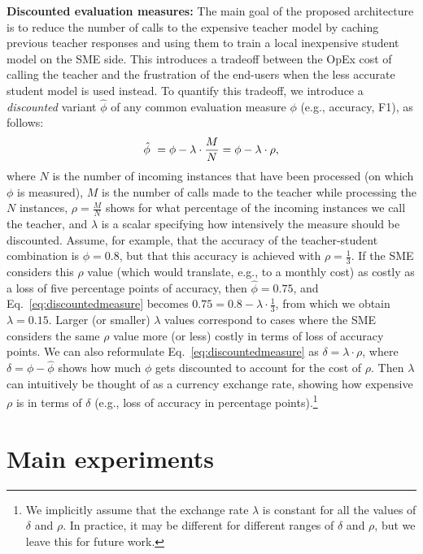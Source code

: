 \documentclass[11pt]{article}
\begin{document}
\vspace{1mm}\noindent\textbf{Discounted evaluation measures:}
The main goal of the proposed architecture is to reduce the number of calls to the expensive teacher model by caching previous teacher responses and using them to train a local inexpensive student model on the SME side. This introduces a tradeoff between the OpEx cost of calling the teacher and the frustration of the end-users when the less accurate student model is used instead. To quantify this tradeoff, we introduce a \emph{discounted} variant $\hat{\phi}$ of any common evaluation measure $\phi$ (e.g., accuracy, F1), as follows:
\begin{equation}
\label{eq:discountedmeasure}   
\hat{\phi}\ = \phi - \lambda \cdot \frac{M}{N} = 
\phi - \lambda \cdot \rho,
\vspace{-2mm}
\end{equation}
where $N$ is the number of incoming instances that have been processed (on which $\phi$ is measured), $M$ is the number of calls made to the teacher while processing the $N$ instances, $\rho = \frac{M}{N}$ shows for what percentage of the incoming instances we call the teacher, and $\lambda$ is a scalar specifying how intensively the measure should be discounted. Assume, for example, that the accuracy of the teacher-student combination is $\phi = 0.8$, but that this accuracy is achieved with $\rho=\frac{1}{3}$. If the SME considers this $\rho$ value (which would translate, e.g., to a monthly cost) as costly as a loss of five percentage points of accuracy, then $\hat{\phi} = 0.75$, and Eq.~\ref{eq:discountedmeasure} becomes $0.75 = 0.8 - \lambda \cdot \frac{1}{3}$, from which we obtain $\lambda = 0.15$. Larger (or smaller) $\lambda$ values correspond to cases where the SME considers the same $\rho$ value more (or less) costly in terms of loss of accuracy points. We can also reformulate Eq.~\ref{eq:discountedmeasure} as $\delta = \lambda \cdot \rho$, where $\delta = \phi - \hat{\phi}$ shows how much $\phi$ gets discounted to account for the cost of $\rho$. Then $\lambda$ can intuitively be thought of as a currency exchange rate, showing how expensive $\rho$ is in terms of $\delta$ (e.g., loss of accuracy in percentage points).\footnote{We implicitly assume that the exchange rate $\lambda$ is constant for all the values of $\delta$ and $\rho$. In practice, it may be different for different ranges of $\delta$ and $\rho$, but we leave this for future work.} 

\section{Main experiments} \label{sec:main_experiments}
\label{sec:exp_setup}
\end{document}
